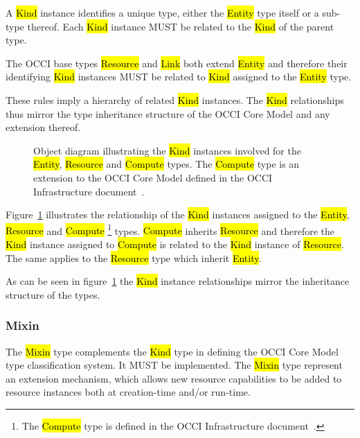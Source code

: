 \documentclass[10pt,a4paper]{article}
\begin{document}
A \hl{Kind} instance identifies a unique type, either the \hl{Entity}
type itself or a sub-type thereof.  Each \hl{Kind} instance MUST be
related to the \hl{Kind} of the parent type.

The OCCI base types \hl{Resource} and \hl{Link} both extend
\hl{Entity} and therefore their identifying \hl{Kind} instances MUST
be related to \hl{Kind} assigned to the \hl{Entity} type.

These rules imply a hierarchy of related \hl{Kind} instances. The
\hl{Kind} relationships thus mirror the type inheritance structure of
the OCCI Core Model and any extension thereof.

\begin{figure}[!h]
  {\centering {} \par}
  \caption{Object diagram illustrating the \hl{Kind} instances
    involved for the \hl{Entity}, \hl{Resource} and \hl{Compute}
    types. The \hl{Compute} type is an extension to the OCCI Core
    Model defined in the OCCI Infrastructure
    document~\cite{occi:infrastructure}.}
  \label{fig:kind_relationships}
\end{figure}

Figure~\ref{fig:kind_relationships} illustrates the relationship of
the \hl{Kind} instances assigned to the \hl{Entity}, \hl{Resource} and
\hl{Compute}%
\footnote{The \hl{Compute} type is defined in the OCCI Infrastructure
 document~\cite{occi:infrastructure}.}
types.
%
\hl{Compute} inherits \hl{Resource} and therefore the \hl{Kind}
instance assigned to \hl{Compute} is related to the \hl{Kind} instance
of \hl{Resource}.  The same applies to the \hl{Resource} type which
inherit \hl{Entity}.

As can be seen in figure~\ref{fig:kind_relationships} the \hl{Kind}
instance relationships mirror the inheritance structure of the types.


\subsubsection{Mixin}
\label{sec:mixin}
The \hl{Mixin} type complements the \hl{Kind} type in defining the
OCCI Core Model type classification system. It MUST be
implemented. The \hl{Mixin} type represent an extension mechanism,
which allows new resource capabilities to be added to resource
instances both at creation-time and/or run-time.
\end{document}
